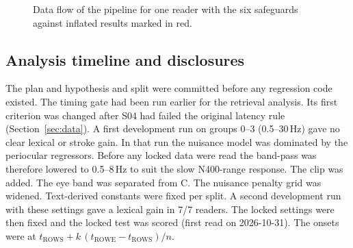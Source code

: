 \documentclass[sigconf]{acmart}
\begin{document}
\begin{figure}[t]
\caption{Data flow of the pipeline for one reader with the six safeguards against inflated results marked in red.}
\label{fig:pipeline}
\end{figure}

\subsection{Analysis timeline and disclosures}
\label{sec:decided}
The plan and hypothesis and split were committed before any regression code existed. The timing gate had been run earlier for the retrieval analysis. Its first criterion was changed after S04 had failed the original latency rule (Section~\ref{sec:data}). A first development run on groups 0--3 (0.5--30\,Hz) gave no clear lexical or stroke gain. In that run the nuisance model was dominated by the periocular regressors. Before any locked data were read the band-pass was therefore lowered to 0.5--8\,Hz to suit the slow N400-range response. The clip was added. The eye band was separated from C. The nuisance penalty grid was widened. Text-derived constants were fixed per split. A second development run with these settings gave a lexical gain in 7/7 readers. The locked settings were then fixed and the locked test was scored (first read on 2026-10-31). The onsets were at $t_\text{ROWS} + k\,(t_\text{ROWE}-t_\text{ROWS})/n$.
\end{document}
